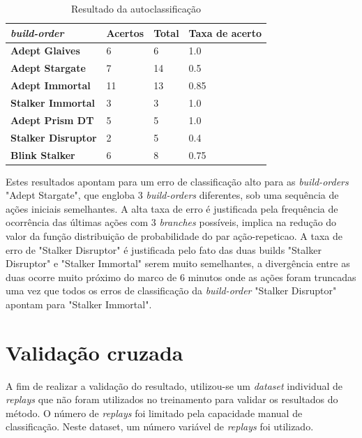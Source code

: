 \begin{table}[H]
\centering
\caption{Resultado da autoclassificação}
\label{tab:resultados-autoclassificacao}
\begin{tabular}{l|l|l|l}
	\textit{\Gls{build-order}} 		& Acertos 	& Total & Taxa de acerto 	\\ \hline
	\textbf{Adept Glaives} 		& 6  		& 6  	& 1.0				\\
	\textbf{Adept Stargate} 		& 7  		& 14 	& 0.5				\\
	\textbf{Adept Immortal} 		& 11 		& 13 	& 0.85				\\
	\textbf{Stalker Immortal} 	& 3  		& 3  	& 1.0				\\
	\textbf{Adept Prism DT} 		& 5  		& 5  	& 1.0				\\
	\textbf{Stalker Disruptor} 	& 2  		& 5 	 	& 0.4				\\
	\textbf{Blink Stalker}	 	& 6  		& 8  	& 0.75	
\end{tabular}
\end{table}

Estes resultados apontam para um erro de classificação alto para as \textit{\glspl{build-order}} "Adept Stargate", que engloba 3 \textit{\glspl{build-order}} diferentes, sob uma sequência de ações iniciais semelhantes. A alta taxa de erro é justificada pela frequência de ocorrência das últimas ações com 3 \textit{branches} possíveis, implica na redução do valor da função distribuição de probabilidade do par ação-\gls{repeticao}. A taxa de erro de "Stalker Disruptor" é justificada pelo fato das duas builds "Stalker Disruptor" e "Stalker Immortal" serem muito semelhantes, a divergência entre as duas ocorre muito próximo do marco de 6 minutos onde as ações foram truncadas uma vez que todos os erros de classificação da \textit{\gls{build-order}} "Stalker Disruptor" apontam para "Stalker Immortal".

		\section{Validação cruzada}
A fim de realizar a validação do resultado, utilizou-se um \textit{dataset} individual de \textit{\glspl{replay}} que não foram utilizados no treinamento para validar os resultados do método. O número de \textit{\glspl{replay}} foi limitado pela capacidade manual de classificação. Neste dataset, um número variável de \textit{\glspl{replay}} foi utilizado.

